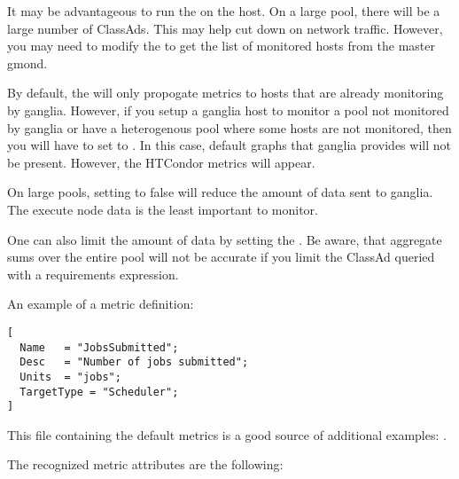 It may be advantageous to run the  on the 
host.
On a large pool, there will be a large number of ClassAds.
This may help cut down on network traffic.
However, you may need to modify the  to get the
list of monitored hosts from the master gmond.

By default, the  will only propogate metrics to hosts
that are already monitoring by ganglia.
However, if you setup a ganglia host to monitor a pool not monitored by ganglia
or have a heterogenous pool where some hosts are not monitored, then you will
have to set  to .
In this case, default graphs that ganglia provides will not be present.
However, the HTCondor metrics will appear.

On large pools, setting  to false
will reduce the amount of data sent to ganglia.
The execute node data is the least important to monitor.

One can also limit the amount of data by setting the
.
Be aware, that aggregate sums over the entire pool will not be accurate
if you limit the ClassAd queried with a requirements expression.

An example of a metric definition:

\begin{verbatim}
[
  Name   = "JobsSubmitted";
  Desc   = "Number of jobs submitted";
  Units  = "jobs";
  TargetType = "Scheduler";
]
\end{verbatim}

  This file containing the default metrics is a good source of
  additional examples: 
  .

  The recognized metric attributes are the following:

